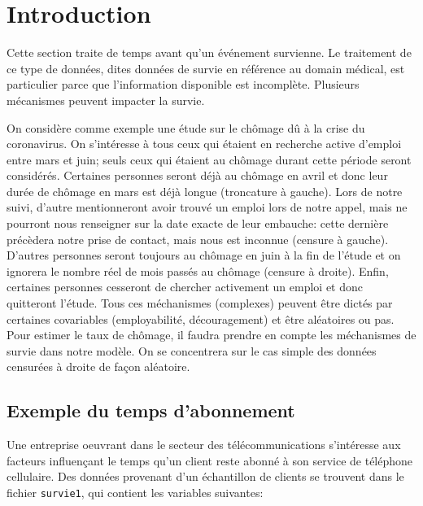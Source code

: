 \documentclass[
  11pt,
  letterpaper,
]{book}
\theoremstyle{definition}
\theoremstyle{remark}
\begin{document}
\hypertarget{introduction-4}{%
\section{Introduction}\label{introduction-4}}

Cette section traite de temps avant qu'un événement survienne. Le
traitement de ce type de données, dites données de survie en référence
au domain médical, est particulier parce que l'information disponible
est incomplète. Plusieurs mécanismes peuvent impacter la survie.

On considère comme exemple une étude sur le chômage dû à la crise du
coronavirus. On s'intéresse à tous ceux qui étaient en recherche active
d'emploi entre mars et juin; seuls ceux qui étaient au chômage durant
cette période seront considérés. Certaines personnes seront déjà au
chômage en avril et donc leur durée de chômage en mars est déjà longue
(troncature à gauche). Lors de notre suivi, d'autre mentionneront avoir
trouvé un emploi lors de notre appel, mais ne pourront nous renseigner
sur la date exacte de leur embauche: cette dernière précèdera notre
prise de contact, mais nous est inconnue (censure à gauche). D'autres
personnes seront toujours au chômage en juin à la fin de l'étude et on
ignorera le nombre réel de mois passés au chômage (censure à droite).
Enfin, certaines personnes cesseront de chercher activement un emploi et
donc quitteront l'étude. Tous ces méchanismes (complexes) peuvent être
dictés par certaines covariables (employabilité, découragement) et être
aléatoires ou pas. Pour estimer le taux de chômage, il faudra prendre en
compte les méchanismes de survie dans notre modèle. On se concentrera
sur le cas simple des données censurées à droite de façon aléatoire.

\hypertarget{exemple-du-temps-dabonnement}{%
\subsection{Exemple du temps
d'abonnement}\label{exemple-du-temps-dabonnement}}

Une entreprise oeuvrant dans le secteur des télécommunications
s'intéresse aux facteurs influençant le temps qu'un client reste abonné
à son service de téléphone cellulaire. Des données provenant d'un
échantillon de clients se trouvent dans le fichier \texttt{survie1}, qui
contient les variables suivantes:
\end{document}
